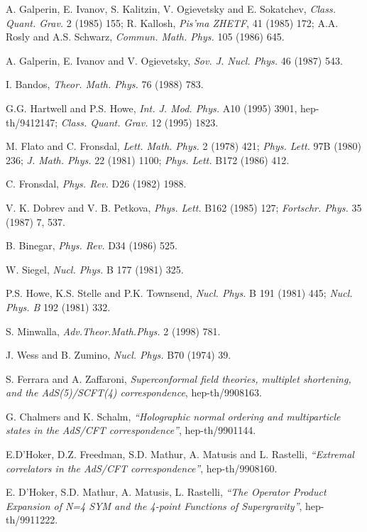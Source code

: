 \documentclass[a4paper,12pt]{article}
\begin{document}
\begin{thebibliography}{99}
 A. Galperin, E. Ivanov, S. Kalitzin, V. Ogievetsky 
and E. Sokatchev, {\it Class. Quant. Grav.}  2 (1985) 155; R. 
Kallosh, {\it Pis'ma ZHETF}, 41 (1985) 172; A.A. Rosly and A.S. 
Schwarz,  {\it Commun. Math. Phys.} 105 (1986) 645. 

 A. Galperin, 
E. Ivanov and V. Ogievetsky, {\it Sov. J. Nucl. Phys.} 46 (1987) 
543.

 I. Bandos, {\it Theor. Math. Phys. } 76 (1988)  783. 

G.G. Hartwell and P.S. Howe, {\it Int. J. Mod. Phys.} A10 (1995) 
3901, hep-th/9412147; {\it Class. Quant. Grav.}  12 (1995) 1823. 


M. Flato and C. Fronsdal, {\it Lett. Math. Phys.} 2 (1978) 421; 
{\it Phys. Lett.} 97B (1980) 236; {\it J. Math. Phys.} 22 (1981) 
1100; {\it Phys. Lett.} B172 (1986) 412. 

 C. Fronsdal, {\it Phys. Rev.}
D26 (1982) 1988. 

V. K. Dobrev and V. B. Petkova, {\it Phys. Lett.} B162 (1985) 
127; {\it Fortschr. Phys.} 35 (1987) 7, 537. 

 B. Binegar, {\it Phys. Rev.} D34 (1986) 525.

 W. Siegel, {\it Nucl. Phys.} B 177 (1981) 325. 

 P.S. Howe, K.S. Stelle and P.K. Townsend, {\it Nucl.
Phys.} B 191 (1981) 445; {\it Nucl. Phys. B} 192 (1981) 332. 



 S. Minwalla, {\it Adv.Theor.Math.Phys.} 2 (1998) 781. 
 

 J. Wess and B. Zumino, {\it  Nucl. Phys.} 
B70 (1974) 39. 

 S. Ferrara and A. Zaffaroni, 
{\it Superconformal field theories, multiplet shortening, and the  
AdS(5)/SCFT(4) correspondence}, hep-th/9908163. 

G. Chalmers and K. Schalm, {\sl ``Holographic normal ordering and 
multiparticle states in the AdS/CFT correspondence''}, 
hep-th/9901144. 

E.D'Hoker, D.Z. Freedman, S.D. Mathur, A. Matusis and L. Rastelli, 
{\sl ``Extremal correlators in the AdS/CFT correspondence''}, 
hep-th/9908160. 

E. D'Hoker, S.D. Mathur, A. Matusis, L. Rastelli, {\sl ``The 
Operator Product Expansion of N=4 SYM and the 4-point Functions 
 of Supergravity''}, hep-th/9911222.


\end{thebibliography}
\end{document}
